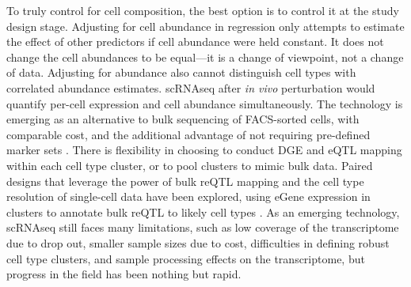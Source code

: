 To truly control for cell composition, the best option is to control it at the study design stage.
Adjusting for cell abundance in regression only attempts to estimate the effect of other predictors if cell abundance were held constant.
It does not change the cell abundances to be equal---it is a change of viewpoint, not a change of data.
Adjusting for abundance also cannot distinguish cell types with correlated abundance estimates.
\Gls{scRNAseq} after \textit{in vivo} perturbation would quantify per-cell expression and cell abundance simultaneously.
The technology is emerging as an alternative to bulk sequencing of \gls{FACS}-sorted cells, with comparable cost,
and the additional advantage of not requiring pre-defined marker sets \autocite{vanderwijst2020SinglecellEQTLGenConsortium}.
There is flexibility in choosing to conduct \gls{DGE} and \gls{eQTL} mapping within each cell type cluster, or to pool clusters to mimic bulk data.
Paired designs that leverage the power of bulk \gls{reQTL} mapping and the cell type resolution of single-cell data have been explored,
using eGene expression in clusters to annotate bulk \gls{reQTL} to likely cell types \autocite{devries2020IntegratingGWASBulk}.
As an emerging technology, \gls{scRNAseq} still faces many limitations, such as
    low coverage of the transcriptome due to drop out, 
    smaller sample sizes due to cost,
    difficulties in defining robust cell type clusters,
    and sample processing effects on the transcriptome,
but progress in the field has been nothing but rapid.

%
%
%
%

